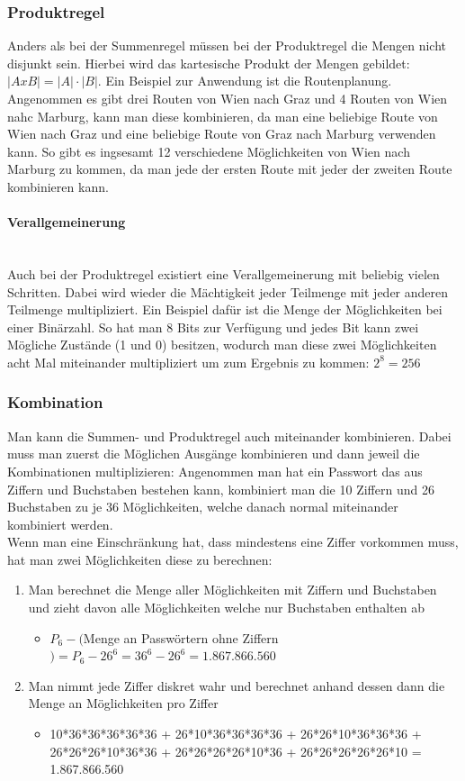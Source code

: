 \documentclass{article}
\newcommand{\paragraphlb}[1]{\paragraph{#1}\mbox{}\\}
\begin{document}
	\subsubsection{Produktregel}
	Anders als bei der Summenregel müssen bei der Produktregel die Mengen nicht disjunkt sein. Hierbei wird das kartesische Produkt der Mengen gebildet: $|AxB|=|A|\cdot|B|$. Ein Beispiel zur Anwendung ist die Routenplanung. Angenommen es gibt drei Routen von Wien nach Graz und 4 Routen von Wien nahc Marburg, kann man diese kombinieren, da man eine beliebige Route von Wien nach Graz und eine beliebige Route von Graz nach Marburg verwenden kann. So gibt es ingsesamt 12 verschiedene Möglichkeiten von Wien nach Marburg zu kommen, da man jede der ersten Route mit jeder der zweiten Route kombinieren kann.
	\paragraphlb{Verallgemeinerung}
	Auch bei der Produktregel existiert eine Verallgemeinerung mit beliebig vielen Schritten. Dabei wird wieder die Mächtigkeit jeder Teilmenge mit jeder anderen Teilmenge multipliziert. Ein Beispiel dafür ist die Menge der Möglichkeiten bei einer Binärzahl. So hat man 8 Bits zur Verfügung und jedes Bit kann zwei Mögliche Zustände (1 und 0) besitzen, wodurch man diese zwei Möglichkeiten acht Mal miteinander multipliziert um zum Ergebnis zu kommen: $2^8=256$
	\subsubsection{Kombination}
	Man kann die Summen- und Produktregel auch miteinander kombinieren. Dabei muss man zuerst die Möglichen Ausgänge kombinieren und dann jeweil die Kombinationen multiplizieren: Angenommen man hat ein Passwort das aus Ziffern und Buchstaben bestehen kann, kombiniert man die 10 Ziffern und 26 Buchstaben zu je 36 Möglichkeiten, welche danach normal miteinander kombiniert werden. \\
	Wenn man eine Einschränkung hat, dass mindestens eine Ziffer vorkommen muss, hat man zwei Möglichkeiten diese zu berechnen:
	\begin{enumerate}
		\item{Man berechnet die Menge aller Möglichkeiten mit Ziffern und Buchstaben und zieht davon alle Möglichkeiten welche nur Buchstaben enthalten ab}
		\begin{itemize}
			\item{$P_6 - ($Menge an Passwörtern ohne Ziffern$) = P_6 - 26^6 = 36^6 - 26^6 = 1.867.866.560$}
		\end{itemize}
		\item{Man nimmt jede Ziffer diskret wahr und berechnet anhand dessen dann die Menge an Möglichkeiten pro Ziffer}
		\begin{itemize}
			\item{10*36*36*36*36*36 + 26*10*36*36*36*36 + 26*26*10*36*36*36 + 26*26*26*10*36*36 + 26*26*26*26*10*36 + 26*26*26*26*26*10 = 1.867.866.560}
		\end{itemize}
	\end{enumerate}
\end{document}
